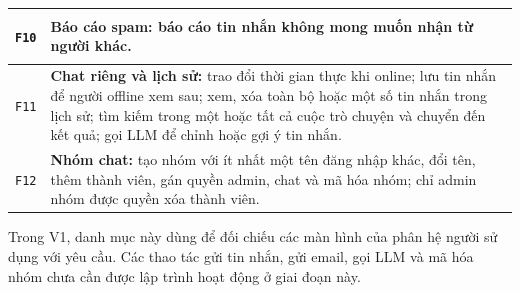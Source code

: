 \begin{longtable}{|C{1.2cm}|L{\dimexpr\textwidth-1.2cm-4\arrayrulewidth\relax}|}
  \hline
  \hypertarget{F10}{\texttt{F10}} &
  \textbf{Báo cáo spam:} báo cáo tin nhắn không mong muốn nhận từ người khác.\\
  \hline
  \hypertarget{F11}{\texttt{F11}} &
  \textbf{Chat riêng và lịch sử:} trao đổi thời gian thực khi online; lưu
  tin nhắn để người offline xem sau; xem, xóa toàn bộ hoặc một số tin nhắn
  trong lịch sử; tìm kiếm trong một hoặc tất cả cuộc trò chuyện và chuyển
  đến kết quả; gọi LLM để chỉnh hoặc gợi ý tin nhắn.\\
  \hline
  \hypertarget{F12}{\texttt{F12}} &
  \textbf{Nhóm chat:} tạo nhóm với ít nhất một tên đăng nhập khác, đổi tên,
  thêm thành viên, gán quyền admin, chat và mã hóa nhóm; chỉ admin nhóm
  được quyền xóa thành viên.\\
  \hline
\end{longtable}
\endgroup

Trong V1, danh mục này dùng để đối chiếu các màn hình của phân hệ người sử dụng
với yêu cầu. Các thao tác gửi tin nhắn, gửi email, gọi LLM và mã hóa nhóm
chưa cần được lập trình hoạt động ở giai đoạn này.

